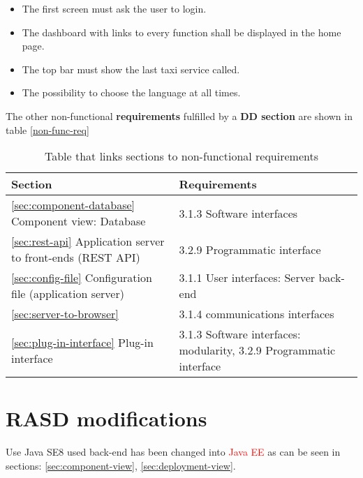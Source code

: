 \begin{itemize}
\item The first screen must ask the user to login.
\item The dashboard with links to every function shall be displayed in the home page.
\item The top bar must show the last taxi service called.
\item The possibility to choose the language at all times.
\end{itemize}
The other non-functional {\bf requirements} fulfilled by a {\bf DD section} are shown in table \autoref{non-func-req}




\begin{table}[h]
\begin{center}
\begin{tabular}{|p{}|p{}|}
\hline
{\bf Section}  & {\bf Requirements}\\
\hline
\autoref{sec:component-database} Component view: Database & 
3.1.3 Software interfaces\\
\hline
\autoref{sec:rest-api} Application server to front-ends (REST API) & 3.2.9 Programmatic interface \\
\hline
\autoref{sec:config-file} Configuration file (application server) & 3.1.1 User interfaces: Server back-end \\
\hline
\autoref{sec:server-to-browser} & 3.1.4 communications interfaces \\
\hline
\autoref{sec:plug-in-interface} Plug-in interface & 3.1.3 Software interfaces: modularity, 3.2.9 Programmatic interface \\
\hline
\end{tabular}
\caption{Table that links sections to non-functional requirements}
\label{non-func-req}
\end{center}
\end{table}

\section{RASD modifications}
\label{RASD-changes}

Use Java SE8 used back-end has been changed into \textcolor{red}{Java EE} as can be seen in sections: \ref{sec:component-view}, \ref{sec:deployment-view}.







